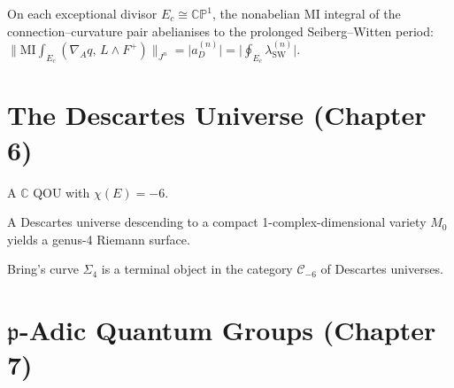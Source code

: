 \begin{proposition}
  \label{prop:mi-sw-abelianisation}
  On each exceptional divisor $E_c \cong \mathbb{CP}^1$, the nonabelian
  MI integral of the connection--curvature pair abelianises to the
  prolonged Seiberg--Witten period:
  $\lVert\mathrm{MI}\!\int_{E_c}(\nabla_A q,\,L \wedge F^+)\rVert_{J^n}
  = \lvert a_D^{(n)}\rvert
  = \lvert\oint_{E_c}\lambda_{\mathrm{SW}}^{(n)}\rvert$.
\end{proposition}


\chapter{The Descartes Universe (Chapter 6)}

\begin{definition}
  \label{def:descartes-condition}
  A $\mathbb{C}$ QOU with $\chi(E) = -6$.
\end{definition}

\begin{proposition}
  \label{prop:genus-maximal-descent}
  A Descartes universe descending to a compact 1-complex-dimensional
  variety $M_0$ yields a genus-4 Riemann surface.
\end{proposition}

\begin{theorem}
  \label{thm:descartes}
  Bring's curve $\Sigma_4$ is a terminal object in the category
  $\mathcal{C}_{-6}$ of Descartes universes.
\end{theorem}


\chapter{\texorpdfstring{$\mathfrak{p}$}{p}-Adic Quantum Groups (Chapter 7)}

